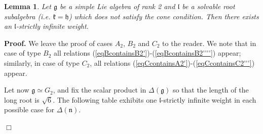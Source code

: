 \documentclass[12pt]{report}
\newtheorem{lemma}[theo]{Lemma}
\newenvironment{proof}[1][]{ \textbf{Proof#1. }}{$\Box$\medskip}
\newcommand{\kk}{\mathfrak{k}}
\newcommand{\nn}{\mathfrak{n}}
\newcommand{\hh}{\mathfrak{h}}
\newcommand{\gG}{\mathfrak{g}}
\newcommand{\lL}{\mathfrak{l}}
\newcommand{\sP}{\mathrm{sp}}
\newcommand{\so}{\mathrm{so}}
\begin{document}
\begin{lemma}\label{leRank2Solvable}
Let $\gG$ be a simple Lie algebra of rank 2 and $\lL$ be a solvable root subalgebra (i.e. $\kk=\hh$) which does not satisfy the cone condition. Then there exists an $\lL$-strictly infinite weight.
\end{lemma}
\begin{proof}
We leave the proof of cases $A_2$, $B_2$ and $C_2$  to the reader. We note that in case of type $B_2$ all relations (\ref{eqBcontainsB2'})-(\ref{eqBcontainsB2''''}) appear; similarly, in case of type $C_2$, all relations (\ref{eqCcontainsA2'})-(\ref{eqCcontainsC2'''}) appear.

Let now $\gG\simeq G_2$, and fix the scalar product in $\Delta(\gG)$ so that the length of the long root is $\sqrt{6}$. The following table exhibits one $\lL$-strictly infinite weight in each possible case for $\Delta(\nn)$.


\end{proof}
\end{document}
